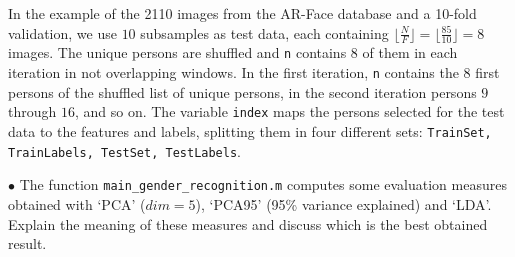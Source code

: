 In the example of the 2110 images from the AR-Face database and a 10-fold validation, we use $ 10 $ subsamples as test data, each containing $ \lfloor\frac{N}{F}\rfloor = \lfloor\frac{85}{10}\rfloor = 8 $ images. The unique persons are shuffled and \texttt{n} contains $ 8 $ of them in each iteration in not overlapping windows. In the first iteration, \texttt{n} contains the $ 8 $ first persons of the shuffled list of unique persons, in the second iteration persons $9$ through $16$, and so on. The variable \texttt{index} maps the persons selected for the test data to the features and labels, splitting them in four different sets: \texttt{TrainSet, TrainLabels, TestSet, TestLabels}.\newline

\question

$ \bullet $ The function \texttt{main\_gender\_recognition.m} computes some evaluation measures obtained with `PCA'
($ dim= 5 $), `PCA95' (95\% variance explained) and `LDA'. Explain the meaning of these measures and discuss which is the best obtained result.